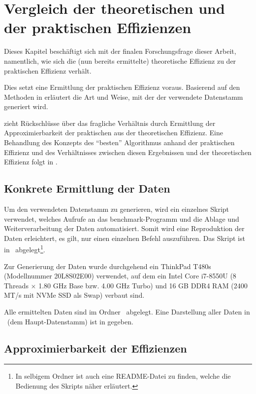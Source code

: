 \chapter{Vergleich der theoretischen und der praktischen Effizienzen}
\label{cha:vergleich}

Dieses Kapitel beschäftigt sich mit der finalen Forschungsfrage dieser Arbeit, namentlich, wie sich die (nun bereits ermittelte) theoretische Effizienz zu der praktischen Effizienz verhält.

Dies setzt eine Ermittlung der praktischen Effizienz voraus. Basierend auf den Methoden in  erläutert  die Art und Weise, mit der der verwendete Datenstamm generiert wird.

 zieht Rückschlüsse über das fragliche Verhältnis durch Ermittlung der Approximierbarkeit der praktischen aus der theoretischen Effizienz. Eine Behandlung des Konzepts des \enquote{besten} Algorithmus anhand der praktischen Effizienz und des Verhältnisses zwischen diesen Ergebnissen und der theoretischen Effizienz folgt in .

\section{Konkrete Ermittlung der Daten}
\label{sec:data-generation}

Um den verwendeten Datenstamm zu generieren, wird ein einzelnes Skript verwendet, welches Aufrufe an das benchmark-Programm und die Ablage und Weiterverarbeitung der Daten automatisiert. Somit wird eine Reproduktion der Daten erleichtert, es gilt, nur einen einzelnen Befehl auszuführen. Das Skript ist in \crScriptsGenerate\ abgelegt\footnote{In selbigem Ordner ist auch eine README-Datei zu finden, welche die Bedienung des Skripts näher erläutert.}.

Zur Generierung der Daten wurde durchgehend ein ThinkPad T480s (Modellnummer 20L8S02E00) verwendet, auf dem ein Intel Core i7-8550U (8 Threads $\times$ 1.80 GHz Base bzw. 4.00 GHz Turbo) und 16 GB DDR4 RAM (2400 MT/s mit NVMe SSD als Swap) verbaut sind.

Alle ermittelten Daten sind im Ordner \crData\ abgelegt. Eine Darstellung aller Daten in \crDataCanon\ (dem Haupt-Datenstamm) ist in  gegeben.

\section{Approximierbarkeit der Effizienzen}
\label{sec:approximation}

